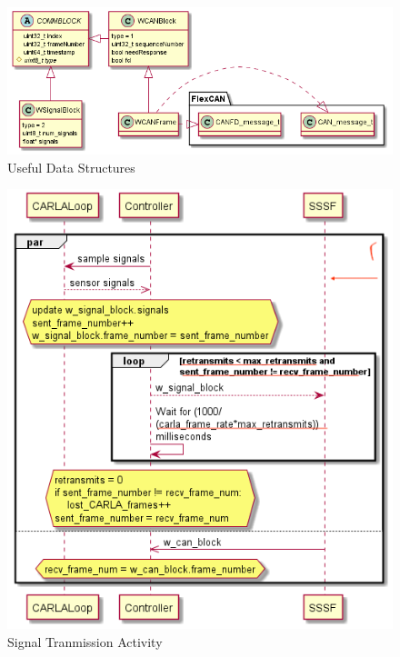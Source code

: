 \documentclass[letterpaper,twocolumn,12pt]{article}
\begin{document}
\begin{figure}[t!]
    \centering
    \includegraphics[width=\linewidth]{out/images/data_structures/data_structures.png}
    \caption{Useful Data Structures}
    \label{fig:ds}
\end{figure}
\begin{figure}[t!]
    \centering
    \includegraphics[width=\linewidth]{out/images/signal_control/signal_control.png}
    \caption{Signal Tranmission Activity}
    \label{fig:sig_x}
\end{figure}
\end{document}
